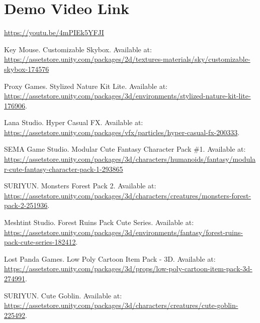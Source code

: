 \documentclass[]{final_report}
\begin{document}
\section{Demo Video Link}
\url{https://youtu.be/4mPIEk5YFJI}

\newpage

\raggedright


\renewcommand{\bibname}{Assets Used}
\begin{thebibliography}{99}

 Key Mouse. Customizable Skybox. Available at: \url{https://assetstore.unity.com/packages/2d/textures-materials/sky/customizable-skybox-174576}

 Proxy Games. Stylized Nature Kit Lite. Available at: \url{https://assetstore.unity.com/packages/3d/environments/stylized-nature-kit-lite-176906}. 

 Lana Studio. Hyper Casual FX. Available at: \url{https://assetstore.unity.com/packages/vfx/particles/hyper-casual-fx-200333}.

 SEMA Game Studio. Modular Cute Fantasy Character Pack \#1. Available at: \url{https://assetstore.unity.com/packages/3d/characters/humanoids/fantasy/modular-cute-fantasy-character-pack-1-293865}

 SURIYUN. Monsters Forest Pack 2. Available at: \url{https://assetstore.unity.com/packages/3d/characters/creatures/monsters-forest-pack-2-251936}. 

 Meshtint Studio. Forest Ruins Pack Cute Series. Available at: \url{https://assetstore.unity.com/packages/3d/environments/fantasy/forest-ruins-pack-cute-series-182412}. 

 Lost Panda Games. Low Poly Cartoon Item Pack - 3D. Available at: \url{https://assetstore.unity.com/packages/3d/props/low-poly-cartoon-item-pack-3d-274991}. 

 SURIYUN. Cute Goblin. Available at: \url{https://assetstore.unity.com/packages/3d/characters/creatures/cute-goblin-225492}. 

\end{thebibliography}

\label{endpage}
\end{document}
